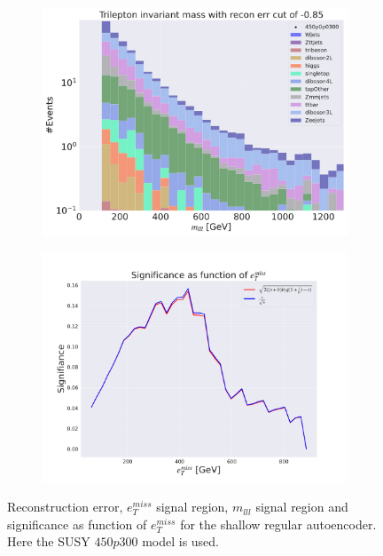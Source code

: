 \begin{figure}[H]
    \hfill
    \begin{subfigure}{.49\textwidth}
        \includegraphics[width=\textwidth]{Figures/AE_testing/small/3lep/b_data_recon_big_rm3_feats_sig_450p0p0300_mlll_recon_errcut_-0.85.pdf}
        \caption{}
        \label{fig:AE_3lep_small_mlll_450_3}
    \end{subfigure}
    \hfill   
    \begin{subfigure}{.49\textwidth}
        \includegraphics[width=\textwidth]{Figures/AE_testing/small/3lep/significance_etmiss_450p0p0300_-0.8533980148308666.pdf}
        \caption{}
        \label{fig:AE_3lep_small_signi_450_3}
    \end{subfigure}
    \hfill      
    \caption[3lep shallow network | $450p300$ | AE | 3]{Reconstruction error, $e_T^{miss}$ signal region, $m_{lll}$ signal region and significance as function of 
    $e_T^{miss}$ for the shallow regular autoencoder. Here the SUSY $450p300$ model is used.}
    \label{fig:AE_3lep_small_rec_sig_signi_450_3}
\end{figure}








